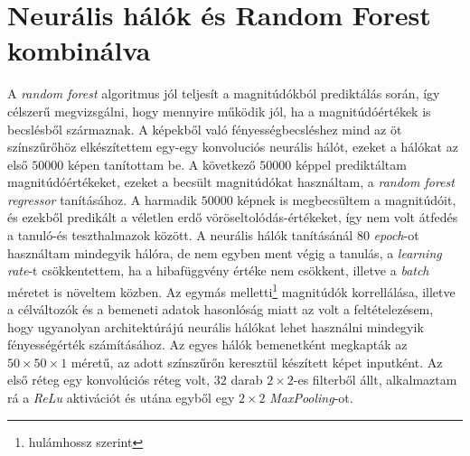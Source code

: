 \documentclass[12pt,letterpaper,oneside,openright]{book}
\begin{document}
\section{Neurális hálók és Random Forest kombinálva}
A \textit{random forest} algoritmus jól teljesít a magnitúdókból prediktálás során, így célszerű megvizsgálni, hogy mennyire működik jól, ha a magnitúdóértékek is becslésből származnak. A képekből való fényességbecsléshez mind az öt színszűrőhöz elkészítettem egy-egy konvoluciós neurális hálót, ezeket a hálókat az első $\num{50000}$ képen tanítottam be. A következő $\num{50000}$ képpel prediktáltam magnitúdóértékeket, ezeket a becsült magnitúdókat használtam, a \textit{random forest regressor} tanításához. A harmadik $\num{50000}$ képnek is megbecsültem a magnitúdóit, és ezekből predikált a véletlen erdő vöröseltolódás-értékeket, így nem volt átfedés a tanuló-és teszthalmazok között. A neurális hálók tanításánál 80 \textit{epoch}-ot használtam mindegyik hálóra, de nem egyben ment végig a tanulás, a \textit{learning rate}-t csökkentettem, ha a hibafüggvény értéke nem csökkent, illetve a \textit{batch} méretet is növeltem közben. Az egymás melletti\footnote{hulámhossz szerint} magnitúdók korrellálása, illetve a célváltozók és a bemeneti adatok hasonlóság miatt az volt a feltételezésem, hogy ugyanolyan architektúrájú neurális hálókat lehet használni mindegyik fényességérték számításához.
\newline\indent
Az egyes hálók bemenetként megkapták az $50\times 50\times 1$ méretű, az adott színszűrőn keresztül készített képet inputként. Az első réteg egy konvolúciós réteg volt, $32$ darab $2\times 2$-es filterből állt, alkalmaztam rá a \textit{ReLu} aktivációt és utána egyből egy $2\times 2$ \textit{MaxPooling}-ot.
\end{document}
